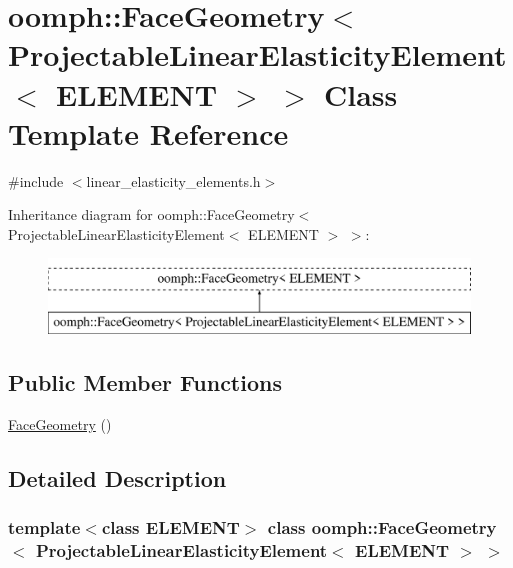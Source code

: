 \hypertarget{classoomph_1_1FaceGeometry_3_01ProjectableLinearElasticityElement_3_01ELEMENT_01_4_01_4}{}\section{oomph\+:\+:Face\+Geometry$<$ Projectable\+Linear\+Elasticity\+Element$<$ E\+L\+E\+M\+E\+NT $>$ $>$ Class Template Reference}
\label{classoomph_1_1FaceGeometry_3_01ProjectableLinearElasticityElement_3_01ELEMENT_01_4_01_4}


{\ttfamily \#include $<$linear\+\_\+elasticity\+\_\+elements.\+h$>$}

Inheritance diagram for oomph\+:\+:Face\+Geometry$<$ Projectable\+Linear\+Elasticity\+Element$<$ E\+L\+E\+M\+E\+NT $>$ $>$\+:\begin{figure}[H]
\begin{center}
\leavevmode
\includegraphics[height=2.000000cm]{classoomph_1_1FaceGeometry_3_01ProjectableLinearElasticityElement_3_01ELEMENT_01_4_01_4}
\end{center}
\end{figure}
\subsection*{Public Member Functions}
\begin{DoxyCompactItemize}
\item 
\hyperlink{classoomph_1_1FaceGeometry_3_01ProjectableLinearElasticityElement_3_01ELEMENT_01_4_01_4_aee713619887054aa197a81ec1dba31bf}{Face\+Geometry} ()
\end{DoxyCompactItemize}


\subsection{Detailed Description}
\subsubsection*{template$<$class E\+L\+E\+M\+E\+NT$>$\newline
class oomph\+::\+Face\+Geometry$<$ Projectable\+Linear\+Elasticity\+Element$<$ E\+L\+E\+M\+E\+N\+T $>$ $>$}

